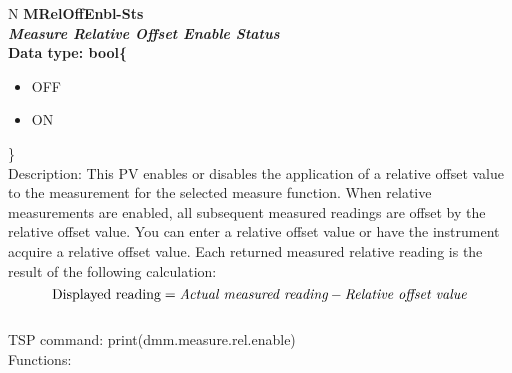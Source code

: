 \documentclass[openany]{article}
\begin{document}
		\begin{tabular}{N}
			\hline
			\bfseries MRelOffEnbl-Sts\label{pv:mreloffenbl-sts} \\ \hline
			\emph{Measure Relative Offset Enable Status} \\
			Data type: bool\{\begin{itemize}[noitemsep]
				\small
				\item[] OFF
				\item[] ON
			\end{itemize}\} \\
			Description: This PV enables or disables the application of a relative offset value to the measurement for the selected measure function. When relative measurements are enabled, all subsequent measured readings are offset by the relative offset value. You can enter a relative offset value or have the instrument acquire a relative offset value. Each returned measured relative reading is the result of the following calculation: $$\text{Displayed reading} = \emph{Actual measured reading} - \emph{Relative offset value}$$ \\
			TSP command: print(dmm.measure.rel.enable) \\
			Functions: \\
			\arrayrulecolor{\FuncTableBorderColor}

		\end{tabular}
\end{document}
